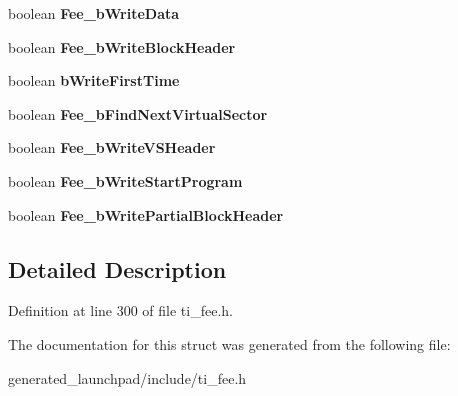 \begin{DoxyCompactItemize}
boolean {\bfseries Fee\+\_\+b\+Write\+Data}
\item 
\mbox{\label{structTI__Fee__GlobalVarsType_a750c77e9edaa7054fe8ec56c3be662bf}} 
boolean {\bfseries Fee\+\_\+b\+Write\+Block\+Header}
\item 
\mbox{\label{structTI__Fee__GlobalVarsType_a0dc90886e57a7d89de0066476055ae1b}} 
boolean {\bfseries b\+Write\+First\+Time}
\item 
\mbox{\label{structTI__Fee__GlobalVarsType_a5643ef7fea664982130d18b69cecb736}} 
boolean {\bfseries Fee\+\_\+b\+Find\+Next\+Virtual\+Sector}
\item 
\mbox{\label{structTI__Fee__GlobalVarsType_a9a006851f3dd3d6676d78903c2423ca1}} 
boolean {\bfseries Fee\+\_\+b\+Write\+V\+S\+Header}
\item 
\mbox{\label{structTI__Fee__GlobalVarsType_a15e92d3d28695a99df82c2d46d3ac177}} 
boolean {\bfseries Fee\+\_\+b\+Write\+Start\+Program}
\item 
\mbox{\label{structTI__Fee__GlobalVarsType_a129d7a2efc5e5e636d21a7640be1c55d}} 
boolean {\bfseries Fee\+\_\+b\+Write\+Partial\+Block\+Header}
\end{DoxyCompactItemize}


\subsection{Detailed Description}


Definition at line 300 of file ti\+\_\+fee.\+h.



The documentation for this struct was generated from the following file\+:\begin{DoxyCompactItemize}
\item 
generated\+\_\+launchpad/include/ti\+\_\+fee.\+h\end{DoxyCompactItemize}
